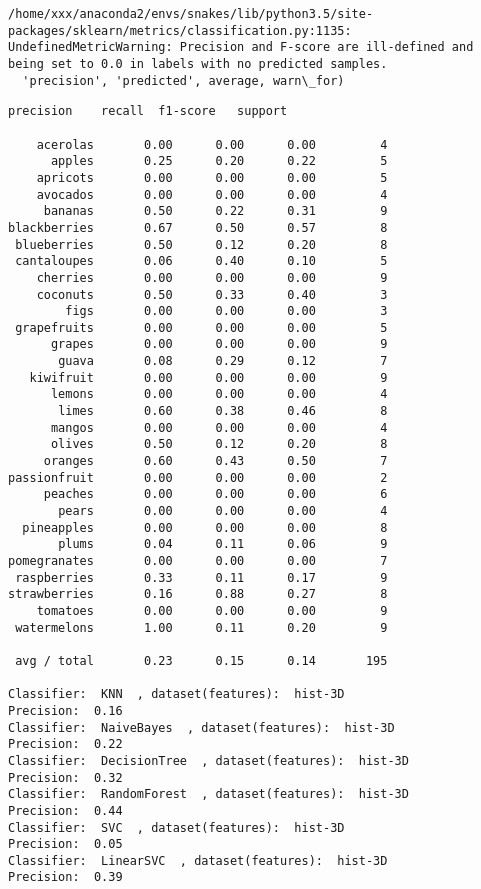 \documentclass[11pt]{article}
\begin{document}
    \begin{Verbatim}[commandchars=\\\{\}]
/home/xxx/anaconda2/envs/snakes/lib/python3.5/site-packages/sklearn/metrics/classification.py:1135: UndefinedMetricWarning: Precision and F-score are ill-defined and being set to 0.0 in labels with no predicted samples.
  'precision', 'predicted', average, warn\_for)

    \end{Verbatim}

    \begin{Verbatim}[commandchars=\\\{\}]
              precision    recall  f1-score   support

    acerolas       0.00      0.00      0.00         4
      apples       0.25      0.20      0.22         5
    apricots       0.00      0.00      0.00         5
    avocados       0.00      0.00      0.00         4
     bananas       0.50      0.22      0.31         9
blackberries       0.67      0.50      0.57         8
 blueberries       0.50      0.12      0.20         8
 cantaloupes       0.06      0.40      0.10         5
    cherries       0.00      0.00      0.00         9
    coconuts       0.50      0.33      0.40         3
        figs       0.00      0.00      0.00         3
 grapefruits       0.00      0.00      0.00         5
      grapes       0.00      0.00      0.00         9
       guava       0.08      0.29      0.12         7
   kiwifruit       0.00      0.00      0.00         9
      lemons       0.00      0.00      0.00         4
       limes       0.60      0.38      0.46         8
      mangos       0.00      0.00      0.00         4
      olives       0.50      0.12      0.20         8
     oranges       0.60      0.43      0.50         7
passionfruit       0.00      0.00      0.00         2
     peaches       0.00      0.00      0.00         6
       pears       0.00      0.00      0.00         4
  pineapples       0.00      0.00      0.00         8
       plums       0.04      0.11      0.06         9
pomegranates       0.00      0.00      0.00         7
 raspberries       0.33      0.11      0.17         9
strawberries       0.16      0.88      0.27         8
    tomatoes       0.00      0.00      0.00         9
 watermelons       1.00      0.11      0.20         9

 avg / total       0.23      0.15      0.14       195

Classifier:  KNN  , dataset(features):  hist-3D
Precision:  0.16
Classifier:  NaiveBayes  , dataset(features):  hist-3D
Precision:  0.22
Classifier:  DecisionTree  , dataset(features):  hist-3D
Precision:  0.32
Classifier:  RandomForest  , dataset(features):  hist-3D
Precision:  0.44
Classifier:  SVC  , dataset(features):  hist-3D
Precision:  0.05
Classifier:  LinearSVC  , dataset(features):  hist-3D
Precision:  0.39

    \end{Verbatim}
\end{document}
